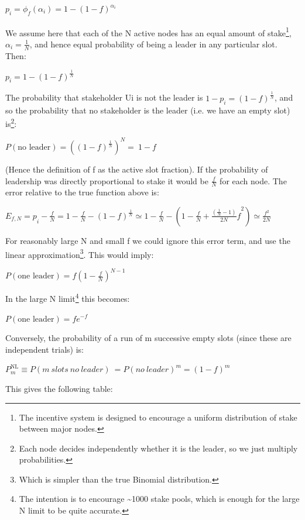 \documentclass[]{article}
\begin{document}
\(p_{i} = {\phi_{f}\left( \alpha_{i} \right) = 1 - \left( 1 - f \right)^{\alpha_{i}}}_{}\)

We assume here that each of the N active nodes has an equal amount of
stake\footnote{The incentive system is designed to encourage a uniform
  distribution of stake between major nodes.},
\(\alpha_{i} = \frac{1}{N}\), and hence equal probability of being a
leader in any particular slot. Then:

\(p_{i}{= 1 - \left( 1 - f \right)^{\frac{1}{N}}}_{}\)

The probability that stakeholder Ui is not the leader is
\({1 - p}_{i} = \left( 1 - f \right)^{\frac{1}{N}}\), and so the
probability that no stakeholder is the leader (i.e. we have an empty
slot) is\footnote{Each node decides independently whether it is the
  leader, so we just multiply probabilities.}:

\(P\left( \text{no\ leader} \right) = \left( \left( 1 - f \right)^{\frac{1}{N}} \right)^{N} = \ 1 - f\)

(Hence the definition of f as the active slot fraction). If the
probability of leadership was directly proportional to stake it would be
\(\frac{f}{N}\) for each node. The error relative to the true function
above is:

\({E_{f,N} = p}_{i} - \frac{f}{N} = 1 - \frac{f}{N} - \left( 1 - f \right)^{\frac{1}{N}} \simeq 1 - \frac{f}{N} - \left( 1 - \frac{f}{N} + {\frac{\left( \frac{1}{N} - 1 \right)}{2N}f}^{2} \right) \simeq \frac{f^{2}}{2N}\)

For reasonably large N and small f we could ignore this error term, and
use the linear approximation\footnote{Which is simpler than the true
  Binomial distribution.}. This would imply:

\(P\left( \text{one\ leader} \right) = f\left( 1 - \frac{f}{N} \right)^{N - 1}\)

In the large N limit\footnote{The intention is to encourage
  \textasciitilde{}1000 stake pools, which is enough for the large N
  limit to be quite accurate.} this becomes:

\(P\left( \text{one\ leader} \right) = fe^{- f}\)

Conversely, the probability of a run of m successive empty slots (since
these are independent trials) is:

\(P_{m}^{\text{NL}} \equiv P(m\ slots\ no\ leader)\  = {P(no\ leader)}^{m} = \left( 1 - f \right)^{m}\)

This gives the following table:
\end{document}
